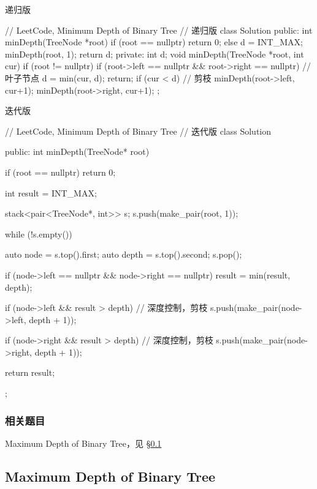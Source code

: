 递归版
\begin{Code}
// LeetCode, Minimum Depth of Binary Tree
// 递归版
class Solution {
public:
    int minDepth(TreeNode *root) {
        if (root == nullptr) return 0;
        else {
            d = INT_MAX;
            minDepth(root, 1);
            return d;
        }
    }
private:
    int d;
    void minDepth(TreeNode *root, int cur) {
        if (root != nullptr) {
            if (root->left == nullptr && root->right == nullptr) { // 叶子节点
                d = min(cur, d);
                return;
            }
            if (cur < d) { // 剪枝
                minDepth(root->left, cur+1);
                minDepth(root->right, cur+1);
            }
        }
    }
};
\end{Code}

迭代版
\begin{Code}
// LeetCode, Minimum Depth of Binary Tree
// 迭代版
class Solution {
public:
    int minDepth(TreeNode* root) {
        if (root == nullptr)
            return 0;

        int result = INT_MAX;

        stack<pair<TreeNode*, int>> s;
        s.push(make_pair(root, 1));

        while (!s.empty()) {
            auto node = s.top().first;
            auto depth = s.top().second;
            s.pop();

            if (node->left == nullptr && node->right == nullptr)
                result = min(result, depth);

            if (node->left && result > depth) // 深度控制，剪枝
                s.push(make_pair(node->left, depth + 1));

            if (node->right && result > depth) // 深度控制，剪枝
                s.push(make_pair(node->right, depth + 1));
        }

        return result;
    }
};
\end{Code}

\subsubsection{相关题目}
\begindot
\item Maximum Depth of Binary Tree，见 \S \ref{sec:maximum-depth-of-binary-tree}
\myenddot


\subsection{Maximum Depth of Binary Tree}
\label{sec:maximum-depth-of-binary-tree}


